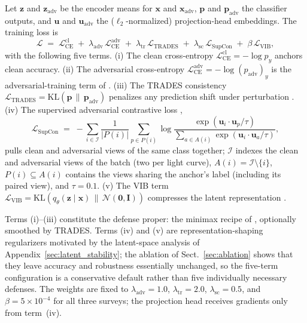 \documentclass{aa}
\begin{document}
Let $\mathbf{z}$ and $\mathbf{z}_{\mathrm{adv}}$ be the encoder means for $\mathbf{x}$ and $\mathbf{x}_{\mathrm{adv}}$, $\mathbf{p}$ and $\mathbf{p}_{\mathrm{adv}}$ the classifier outputs, and $\mathbf{u}$ and $\mathbf{u}_{\mathrm{adv}}$ the ($\ell_2$-normalized) projection-head embeddings. The training loss is
\begin{equation}
\label{eq:loss_total}
\mathcal{L} \;=\; \mathcal{L}_{\mathrm{CE}}^{\mathrm{cl}} \;+\; \lambda_{\mathrm{adv}}\,\mathcal{L}_{\mathrm{CE}}^{\mathrm{adv}} \;+\; \lambda_{\mathrm{tr}}\,\mathcal{L}_{\mathrm{TRADES}} \;+\; \lambda_{\mathrm{sc}}\,\mathcal{L}_{\mathrm{SupCon}} \;+\; \beta\,\mathcal{L}_{\mathrm{VIB}},
\end{equation}
with the following five terms. (i) The clean cross-entropy $\mathcal{L}_{\mathrm{CE}}^{\mathrm{cl}} = -\log p_y$ anchors clean accuracy. (ii) The adversarial cross-entropy $\mathcal{L}_{\mathrm{CE}}^{\mathrm{adv}} = -\log (p_{\mathrm{adv}})_y$ is the adversarial-training term of \citet{madry2017towards}. (iii) The TRADES consistency $\mathcal{L}_{\mathrm{TRADES}} = \mathrm{KL}(\mathbf{p} \,\|\, \mathbf{p}_{\mathrm{adv}})$ penalizes any prediction shift under perturbation \citep{zhang2019theoretically}.
(iv) The supervised adversarial contrastive loss \citep{khosla2020supervised,kim2020adversarial},
\begin{equation}
\mathcal{L}_{\mathrm{SupCon}} \;=\; -\sum_{i \in \mathcal{I}} \frac{1}{|P(i)|}\sum_{p \in P(i)} \log \frac{\exp(\mathbf{u}_i \cdot \mathbf{u}_p / \tau)}{\sum_{a \in A(i)} \exp(\mathbf{u}_i \cdot \mathbf{u}_a / \tau)},
\end{equation}
pulls clean and adversarial views of the same class together; $\mathcal{I}$ indexes the clean and adversarial views of the batch (two per light curve), $A(i)=\mathcal{I}\setminus\{i\}$, $P(i)\subseteq A(i)$ contains the views sharing the anchor's label (including its paired view), and $\tau=0.1$. (v) The VIB term $\mathcal{L}_{\mathrm{VIB}} = \mathrm{KL}(q_\theta(\mathbf{z}\mid\mathbf{x}) \,\|\, \mathcal{N}(\mathbf{0}, \mathbf{I}))$ compresses the latent representation \citep{alemi2017deep}.

Terms (i)--(iii) constitute the defense proper: the minimax recipe of \citet{madry2017towards}, optionally smoothed by TRADES. Terms (iv) and (v) are representation-shaping regularizers motivated by the latent-space analysis of Appendix~\ref{sec:latent_stability}; the ablation of Sect.~\ref{sec:ablation} shows that they leave accuracy and robustness essentially unchanged, so the five-term configuration is a conservative default rather than five individually necessary defenses. The weights are fixed to $\lambda_{\mathrm{adv}} = 1.0$, $\lambda_{\mathrm{tr}} = 2.0$, $\lambda_{\mathrm{sc}} = 0.5$, and $\beta = 5 \times 10^{-4}$ for all three surveys; the projection head receives gradients only from term~(iv).
\end{document}
